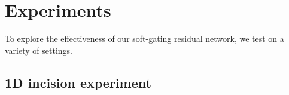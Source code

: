 
\section{Experiments}

\noindent To explore the effectiveness of our soft-gating residual network, we test on a variety of settings.



\subsection{1D incision experiment}


